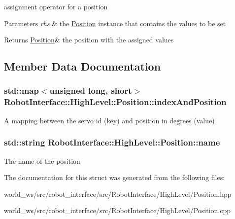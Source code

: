 assignment operator for a position 


\begin{DoxyParams}{Parameters}
{\em rhs} & the \hyperlink{structRobotInterface_1_1HighLevel_1_1Position}{Position} instance that contains the values to be set \\
\hline
\end{DoxyParams}
\begin{DoxyReturn}{Returns}
\hyperlink{structRobotInterface_1_1HighLevel_1_1Position}{Position}\& the position with the assigned values 
\end{DoxyReturn}


\subsection{Member Data Documentation}
\subsubsection[{\texorpdfstring{index\+And\+Position}{indexAndPosition}}]{\setlength{\rightskip}{0pt plus 5cm}std\+::map$<$unsigned long, short$>$ Robot\+Interface\+::\+High\+Level\+::\+Position\+::index\+And\+Position}\hypertarget{structRobotInterface_1_1HighLevel_1_1Position_ac6a4aac4d1afcdcf64674736322906ad}{}\label{structRobotInterface_1_1HighLevel_1_1Position_ac6a4aac4d1afcdcf64674736322906ad}
A mapping between the servo id (key) and position in degrees (value) 
\subsubsection[{\texorpdfstring{name}{name}}]{\setlength{\rightskip}{0pt plus 5cm}std\+::string Robot\+Interface\+::\+High\+Level\+::\+Position\+::name}\hypertarget{structRobotInterface_1_1HighLevel_1_1Position_a57453b45bf2bff7926bbd3bb5904a598}{}\label{structRobotInterface_1_1HighLevel_1_1Position_a57453b45bf2bff7926bbd3bb5904a598}
The name of the position 

The documentation for this struct was generated from the following files\+:\begin{DoxyCompactItemize}
\item 
world\+\_\+ws/src/robot\+\_\+interface/src/\+Robot\+Interface/\+High\+Level/Position.\+hpp\item 
world\+\_\+ws/src/robot\+\_\+interface/src/\+Robot\+Interface/\+High\+Level/Position.\+cpp\end{DoxyCompactItemize}
